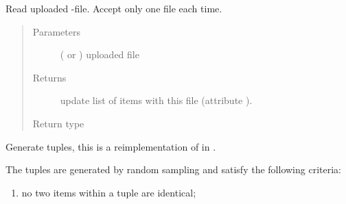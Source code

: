 \documentclass[a4paper,12pt,english]{sphinxmanual}
\begin{document}
\begin{fulllineitems}
\begin{fulllineitems}
\end{fulllineitems}


\begin{fulllineitems}
\label{\detokenize{project_rst/generator:project.generator.DataGenerator.generate_items}}
Read uploaded -file. Accept only one file each time.
\begin{quote}\begin{description}
\item[{Parameters}] \leavevmode
{} ( or ) \textendash{} uploaded file

\item[{Returns}] \leavevmode
update list of items with this file (attribute {\hyperref[\detokenize{project_rst/generator:project.generator.DataGenerator.items}]{}}).

\item[{Return type}] \leavevmode
{}

\end{description}\end{quote}

\end{fulllineitems}


\begin{fulllineitems}
\label{\detokenize{project_rst/generator:project.generator.DataGenerator.generate_tuples}}
Generate tuples, this is a reimplementation of 
in .

The tuples are generated by random sampling and satisfy the following
criteria:
\begin{enumerate}
%
\item {} 
no two items within a tuple are identical;


\end{enumerate}
\end{fulllineitems}
\end{fulllineitems}
\end{document}
